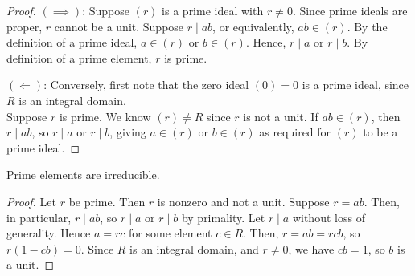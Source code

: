 \begin{proof}
	$(\implies)$: Suppose $(r)$ is a prime ideal with $r \neq 0$.
	Since prime ideals are proper, $r$ cannot be a unit.
	Suppose $r \mid ab$, or equivalently, $ab \in (r)$.
	By the definition of a prime ideal, $a \in (r)$ or $b \in (r)$.
	Hence, $r \mid a$ or $r \mid b$.
	By definition of a prime element, $r$ is prime.

	$(\Longleftarrow)$: Conversely, first note that the zero ideal $(0) = \qty{0}$ is a prime ideal, since $R$ is an integral domain. \\
	Suppose $r$ is prime.
	We know $(r) \neq R$ since $r$ is not a unit.
	If $ab \in (r)$, then $r \mid ab$, so $r \mid a$ or $r \mid b$, giving $a \in (r)$ or $b \in (r)$ as required for $(r)$ to be a prime ideal.
\end{proof}

\begin{lemma} \label{lem:10.2}
	Prime elements are irreducible.
\end{lemma}

\begin{proof}
	Let $r$ be prime.
	Then $r$ is nonzero and not a unit.
	Suppose $r = ab$.
	Then, in particular, $r \mid ab$, so $r \mid a$ or $r \mid b$ by primality.
	Let $r \mid a$ without loss of generality.
	Hence $a = rc$ for some element $c \in R$.
	Then, $r = ab = rcb$, so $r(1-cb) = 0$.
	Since $R$ is an integral domain, and $r \neq 0$, we have $cb = 1$, so $b$ is a unit.
\end{proof}

